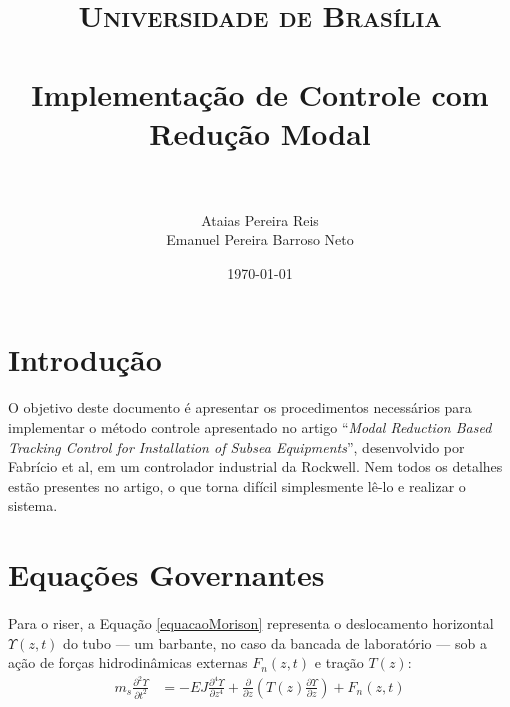 \documentclass[a4paper,11pt]{scrartcl} %
\title{	
\normalfont \normalsize 
\textsc{Universidade de Brasília} \\ [25pt] %
\horrule{0.5pt} \\[0.4cm] %
\huge Implementação de Controle com Redução Modal \\ %
\horrule{2pt} \\[0.5cm] %
}
\author{Ataias Pereira Reis \\ Emanuel Pereira Barroso Neto} %
\date{\normalsize\today} %
\numberwithin{equation}{section} %
\numberwithin{figure}{section} %
\numberwithin{table}{section} %
\begin{document}
\maketitle %


\section{Introdução}
\paragraph{} O objetivo deste documento é apresentar os procedimentos necessários para implementar o método controle apresentado no artigo ``\textit{Modal Reduction Based Tracking Control for Installation of Subsea Equipments}'', desenvolvido por Fabrício et al, em um controlador industrial da Rockwell. Nem todos os detalhes estão presentes no artigo, o que torna difícil simplesmente lê-lo e realizar o sistema.

\section{Equações Governantes}
\paragraph{} Para o riser, a Equação \ref{equacaoMorison} representa o deslocamento horizontal $\Upsilon(z,t)$ do tubo --- um barbante, no caso da bancada de laboratório --- sob a ação de forças hidrodinâmicas externas $F_n(z,t)$ e tração $T(z)$: \begin{align}
	m_s \frac{\partial^2 \Upsilon}{\partial t^2} &= -EJ \frac{\partial^4 \Upsilon}{\partial z^4} + 	\frac{\partial}{\partial z}\left(T(z)\frac{\partial \Upsilon}{\partial z}\right)+F_n(z,t) \label{equacaoMorison}
\end{align}
\end{document}
